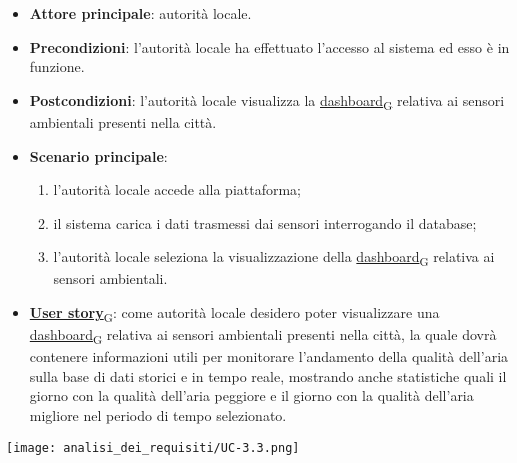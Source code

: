 \begin{itemize}
	\item \textbf{Attore principale}: autorità locale.
	\item \textbf{Precondizioni}: l'autorità locale ha effettuato l'accesso al sistema ed esso è in funzione.
	\item \textbf{Postcondizioni}: l'autorità locale visualizza la \href{https://7last.github.io/docs/pb/documentazione-interna/glossario\#dashboard}{dashboard\textsubscript{G}} relativa
	      ai sensori ambientali presenti nella città.
	\item \textbf{Scenario principale}:
	      \begin{enumerate}
		      \item l'autorità locale accede alla piattaforma;
		      \item il sistema carica i dati trasmessi dai sensori interrogando il database;
		      \item l'autorità locale seleziona la visualizzazione della \href{https://7last.github.io/docs/pb/documentazione-interna/glossario\#dashboard}{dashboard\textsubscript{G}} relativa ai sensori ambientali.
	      \end{enumerate}
	\item \href{https://7last.github.io/docs/pb/documentazione-interna/glossario\#user-story}{\textbf{User story}\textsubscript{G}}:
	      come autorità locale desidero poter visualizzare una \href{https://7last.github.io/docs/pb/documentazione-interna/glossario\#dashboard}{dashboard\textsubscript{G}} relativa ai sensori ambientali presenti nella città, la quale
	      dovrà contenere informazioni utili per monitorare l'andamento della qualità dell'aria sulla base di dati storici e in tempo reale, mostrando
	      anche statistiche quali il giorno con la qualità dell'aria peggiore e il giorno con la qualità dell'aria migliore nel periodo di tempo selezionato.
\end{itemize}
\begin{center}
	\texttt{[image: analisi\_dei\_requisiti/UC-3.3.png]}
\end{center}


